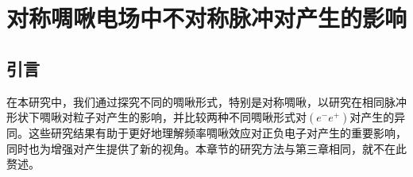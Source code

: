 
\chapter{对称啁啾电场中不对称脉冲对产生的影响}

\section{引言}

在本研究中，我们通过探究不同的啁啾形式，特别是对称啁啾，以研究在相同脉冲形状下啁啾对粒子对产生的影响，并比较两种不同啁啾形式对$(e^{-}e^{+})$对产生的异同。这些研究结果有助于更好地理解频率啁啾效应对正负电子对产生的重要影响，同时也为增强对产生提供了新的视角。本章节的研究方法与第三章相同，就不在此赘述。